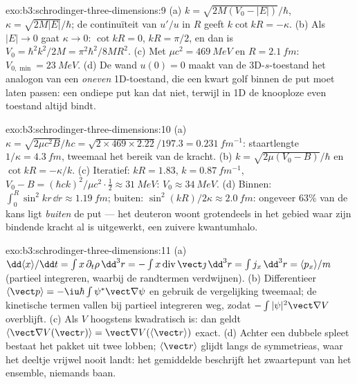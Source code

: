 \begin{solution}{exo:b3:schrodinger-three-dimensions:9}
(a) $k = \sqrt{2M(V_0 - |E|)}/\hbar$, $\kappa = \sqrt{2M|E|}/\hbar$; de
continuïteit van $u'/u$ in $R$ geeft $k\cot kR = -\kappa$. (b) Als $|E|
\to 0$ gaat $\kappa \to 0$: $\cot kR = 0$, $kR = \pi/2$, en dan is $V_0 =
\hbar^2k^2/2M = \pi^2\hbar^2/8MR^2$. (c) Met $\mu c^2 =
\qty{469}{MeV}$
en $R = \qty{2.1}{fm}$: $V_{0,\min} = \qty{23}{MeV}$. (d) De wand $u(0) = 0$ maakt van de 3D-$s$-toestand het analogon van een \emph{oneven}
1D-toestand, die een kwart golf binnen de put moet laten passen: een
ondiepe put kan dat niet, terwijl in 1D de knooploze even toestand altijd
bindt.
\end{solution}

\begin{solution}{exo:b3:schrodinger-three-dimensions:10}
(a) $\kappa = \sqrt{2\mu c^2B}/\hbar c = \sqrt{2 \times 469 \times
2.22}/197.3 = \qty{0.231}{fm^{-1}}$: staartlengte $1/\kappa =
\qty{4.3}{fm}$, tweemaal het bereik van de kracht. (b) $k =
\sqrt{2\mu(V_0 - B)}/\hbar$ en $\cot kR = -\kappa/k$. (c) Iteratief:
$kR = 1.83$, $k = \qty{0.87}{fm^{-1}}$, $V_0 - B = (\hbar ck)^2/\mu
c^2\cdot\tfrac12 \approx \qty{31}{MeV}$: $V_0 \approx \qty{34}{MeV}$.
(d) Binnen: $\int_0^R\sin^2kr\,\dd r \approx \qty{1.19}{fm}$; buiten:
$\sin^2(kR)/2\kappa \approx \qty{2.0}{fm}$: ongeveer $63\%$ van de kans
ligt \emph{buiten} de put --- het deuteron woont grotendeels in het
gebied waar zijn bindende kracht al is uitgewerkt, een zuivere
kwantumhalo.
\end{solution}

\begin{solution}{exo:b3:schrodinger-three-dimensions:11}
(a) $\dd\langle x\rangle/\dd t = \int x\,\partial_t\rho\,\dd^3r =
-\int x\operatorname{div}\vect\jmath\,\dd^3r = \int j_x\,\dd^3r =
\langle p_x\rangle/m$ (partieel integreren, waarbij de randtermen
verdwijnen). (b) Differentieer $\langle\vect p\rangle = -\iu\hbar\int\psi^*\vect\nabla
\psi$ en gebruik de vergelijking tweemaal;
de kinetische termen vallen bij partieel integreren weg, zodat
$-\int|\psi|^2\vect\nabla V$ overblijft. (c) Als $V$ hoogstens
kwadratisch is: dan geldt $\langle\vect\nabla V(\vect r)\rangle = \vect\nabla V(\langle
\vect r\rangle)$ exact. (d) Achter een dubbele
spleet bestaat het pakket uit twee lobben; $\langle\vect r\rangle$ glijdt
langs de symmetrieas, waar het deeltje vrijwel nooit landt: het
gemiddelde beschrijft het zwaartepunt van het ensemble, niemands baan.
\end{solution}

